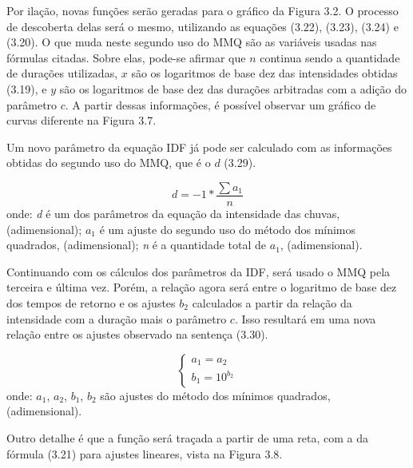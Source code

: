 Por ilação, novas funções serão geradas para o gráfico da Figura 3.2. O processo de descoberta delas será o mesmo, utilizando as equações (3.22), (3.23), (3.24) e (3.20). O que muda neste segundo uso do MMQ são as variáveis usadas nas fórmulas citadas. Sobre elas, pode-se afirmar que $n$ continua sendo a quantidade de durações utilizadas, $x$ são os logaritmos de base dez das intensidades obtidas (3.19), e $y$ são os logaritmos de base dez das durações arbitradas com a adição do parâmetro $c$. A partir dessas informações, é possível observar um gráfico de curvas diferente na Figura 3.7.\bigskip

Um novo parâmetro da equação IDF já pode ser calculado com as informações obtidas do segundo uso do MMQ, que é o $d$ (3.29). 

\begin{equation}
d = -1 * \frac{\sum{a_1}}{n}
\end{equation}
\newline
onde:
\newline
\textit{d} é um dos parâmetros da equação da intensidade das chuvas, (adimensional);
\newline
$a_1$ é um ajuste do segundo uso do método dos mínimos quadrados, (adimensional);
\newline
\textit{n} é a quantidade total de $a_1$, (adimensional).\bigskip

Continuando com os cálculos dos parâmetros da IDF, será usado o MMQ pela terceira e última vez. Porém, a relação agora será entre o logaritmo de base dez dos tempos de retorno e os ajustes $b_2$ calculados a partir da relação da intensidade com a duração mais o parâmetro $c$. Isso resultará em uma nova relação entre os ajustes observado na sentença (3.30).\bigskip

\begin{equation}
\begin{cases}
a_1 = a_2 \\
b_1 = 10^{b_2}
\end{cases}
\end{equation}
\newline
onde:
\newline
$a_1$, $a_2$, $b_1$, $b_2$ são ajustes do método dos mínimos quadrados, (adimensional).\bigskip

Outro detalhe é que a função será traçada a partir de uma reta, com a da fórmula (3.21) para ajustes lineares, vista na Figura 3.8.\bigskip

